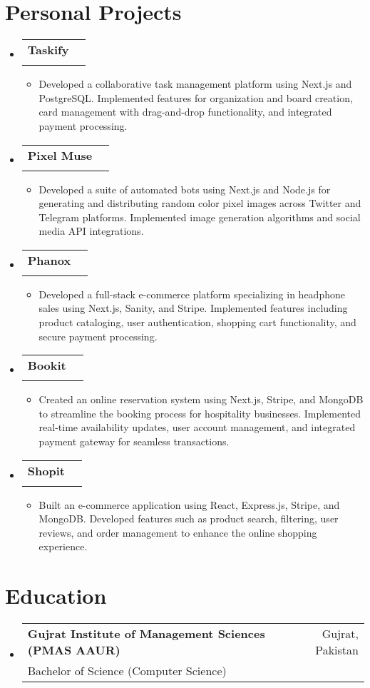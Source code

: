 \documentclass[letterpaper,11pt]{article}
\makeatletter
\newcommand{\resumeItem}[1]{
  \item[]\small{
    {#1 \vspace{-2pt}}
  }
}
\newcommand{\resumeSubheading}[4]{
  \vspace{-1pt}\item
    \begin{tabular*}{0.97\textwidth}[t]{l@{\extracolsep{\fill}}r}
      \textbf{#1} &  {\small#2} \\
      {\small#3} & {\small #4} \\
    \end{tabular*}\vspace{-6pt}
}
\newcommand{\resumeSubHeadingListStart}{\begin{itemize}[leftmargin=0.15in, label={}]}
\newcommand{\resumeSubHeadingListEnd}{\end{itemize}}
\newcommand{\resumeItemListStart}{\begin{itemize}[leftmargin=0.15in, label={}]}
\newcommand{\resumeItemListEnd}{\end{itemize}\vspace{-4pt}}
\makeatother
\begin{document}
\section{Personal Projects}
  \resumeSubHeadingListStart
    \resumeSubheading
    {Taskify}{}{}{}\vspace{-12pt}
      \resumeItemListStart
        \resumeItem{Developed a collaborative task management platform using Next.js and PostgreSQL. Implemented features for organization and board creation, card management with drag-and-drop functionality, and integrated payment processing.}
    \resumeItemListEnd
    \resumeSubheading
    {Pixel Muse}{}{}{}\vspace{-12pt}
      \resumeItemListStart
        \resumeItem{Developed a suite of automated bots using Next.js and Node.js for generating and distributing random color pixel images across Twitter and Telegram platforms. Implemented image generation algorithms and social media API integrations.}
    \resumeItemListEnd
    \resumeSubheading
    {Phanox}{}{}{}\vspace{-12pt}
      \resumeItemListStart
        \resumeItem{Developed a full-stack e-commerce platform specializing in headphone sales using Next.js, Sanity, and Stripe. Implemented features including product cataloging, user authentication, shopping cart functionality, and secure payment processing.}
    \resumeItemListEnd
      \resumeSubheading
      {Bookit}{}{}{}\vspace{-12pt}
      \resumeItemListStart
        \resumeItem{Created an online reservation system using Next.js, Stripe, and MongoDB to streamline the booking process for hospitality businesses. Implemented real-time availability updates, user account management, and integrated payment gateway for seamless transactions.}
    \resumeItemListEnd
    \resumeSubheading
    {Shopit}{}{}{}\vspace{-12pt}
      \resumeItemListStart
        \resumeItem{Built an e-commerce application using React, Express.js, Stripe, and MongoDB. Developed features such as product search, filtering, user reviews, and order management to enhance the online shopping experience.}
    \resumeItemListEnd
  \resumeSubHeadingListEnd

\section{Education}
  \resumeSubHeadingListStart
    \resumeSubheading
      {Gujrat Institute of Management Sciences (PMAS AAUR)}{Gujrat, Pakistan}
      {Bachelor of Science (Computer Science)}{}
  \resumeSubHeadingListEnd
\end{document}
